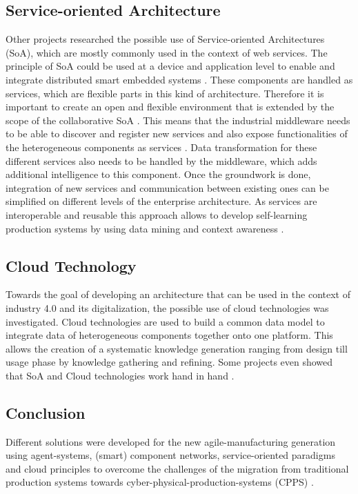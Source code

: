 \documentclass[conference,compsoc,hidelinks]{IEEEtran}
\begin{document}
\subsection{Service-oriented Architecture}
Other projects researched the possible use of Service-oriented Architectures (SoA), which are mostly commonly used in the context of web services. The principle of SoA could be used at a device and application level to enable and integrate distributed smart embedded systems \cite{Colombo2009}. These components are handled as services, which are flexible parts in this kind of architecture. Therefore it is important to create an open and flexible environment that is extended by the scope of the collaborative SoA \cite{HarmonizedSystems}. This means that the industrial middleware needs to be able to discover and register new services and also expose functionalities of the heterogeneous components as services \cite{SpecPERFoRM}. Data transformation for these different services also needs to be handled by the middleware, which adds additional intelligence to this component. Once the groundwork is done, integration of new services and communication between existing ones can be simplified on different levels of the enterprise architecture. As services are interoperable and reusable this approach allows to develop self-learning production systems by using data mining and context awareness \cite{HarmonizedSystems, DENKENA2014406, Peres2017}.


\subsection{Cloud Technology}
Towards the goal of developing an architecture that can be used in the context of industry 4.0 and its digitalization, the possible use of cloud technologies was investigated. Cloud technologies are used to build a common data model to integrate data of heterogeneous components together onto one platform. This allows the creation of a systematic knowledge generation ranging from design till usage phase by knowledge gathering and refining. Some projects even showed that SoA and Cloud technologies work hand in hand \cite{HarmonizedSystems}.  

\subsection{Conclusion}
Different solutions were developed for the new agile-manufacturing generation using agent-systems, (smart) component networks, service-oriented paradigms and cloud principles to overcome the challenges of the migration from traditional production systems towards cyber-physical-production-systems (CPPS) \cite{HarmonizedSystems}.
\end{document}
